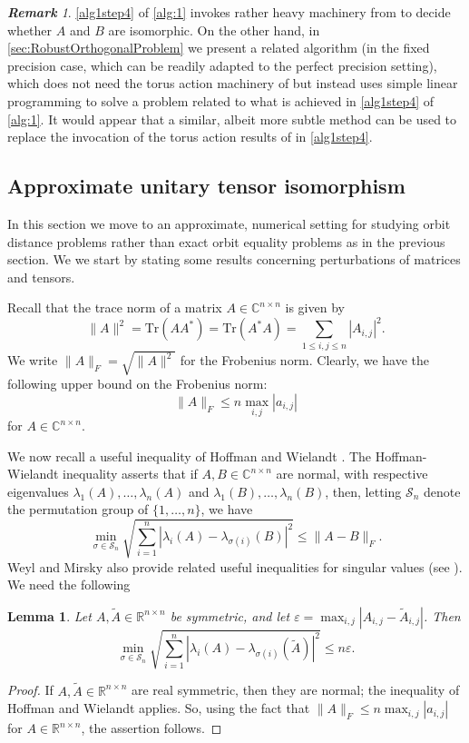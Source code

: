 \documentclass[11pt]{article}
\numberwithin{equation}{section}
\newtheorem{lemma}[theorem]{Lemma}
\theoremstyle{remark}
\newtheorem{remark}{\bf Remark}[section]
\newcommand{\R}{\mathbb{R}}
\newcommand{\CC}{\mathbb{C}}
\newcommand{\RR}{\mathbb{R}}
\newcommand{\cS}{\mathcal{S}}
\begin{document}
\begin{remark}
    \ref{alg1step4} of \cref{alg:1} invokes rather heavy machinery from \cite{burgisser_et_alCCC.2021.32} to decide whether $A$ and $B$ are isomorphic. On the other hand, in \cref{sec:RobustOrthogonalProblem} we present a related algorithm (in the fixed precision case, which can be readily adapted to the perfect precision setting), which does not need the torus action machinery of \cite{burgisser_et_alCCC.2021.32} but instead uses simple linear programming to solve a problem related to what is achieved in \ref{alg1step4} of \cref{alg:1}. It would appear that a similar, albeit more subtle method can be used to replace the invocation of the torus action results of \cite{burgisser_et_alCCC.2021.32} in \ref{alg1step4}.
\end{remark}




\subsection{Approximate unitary tensor isomorphism}

In this section we move to an approximate, numerical setting for studying orbit distance problems rather than exact orbit equality problems as in the previous section.
We we start by stating some results concerning perturbations of matrices and tensors.

Recall that the trace norm of a matrix $A \in \CC^{n\times n}$ is given by
\[
\|A\|^2 = \mathrm{Tr}(AA^*) = \mathrm{Tr}(A^* A) = \sum_{1\leq i, j \leq n} |A_{i,j}|^2.
\]
We write $\|A\|_F = \sqrt{\|A\|^2}$ for the Frobenius norm. Clearly, we have the following upper bound on the Frobenius norm:
\[
\|A\|_F \leq n \max_{i,j} |a_{i,j}|
\]
for $A \in \CC^{n\times n}$.

We now recall a useful inequality of Hoffman and Wielandt \cite{hoffman1953variation}. The Hoffman-Wielandt inequality asserts that if $A, B \in \CC^{n\times n}$ are normal, with respective eigenvalues $\lambda_1(A),\dots,\lambda_n(A)$ and $\lambda_1(B),\dots,\lambda_n(B)$, then, letting $\cS_n$ denote the permutation group of $\{1,\dots,n\}$, we have
\[
\min_{\sigma \in \cS_n}\sqrt{\sum_{i=1}^n |\lambda_i(A)-\lambda_{\sigma(i)}(B)|^2} \leq \|A-B\|_F.
\]
Weyl and Mirsky also provide related useful inequalities for singular values (see \cite{stewart1998perturbation}).
We need the following

\begin{lemma}\label{lem:truncation}
    Let $A,\tilde{A} \in \RR^{n\times n}$ be symmetric, and let $\varepsilon = \max_{i,j}|A_{i,j}-\tilde{A}_{i,j}|$.  Then
    \[
    \min_{\sigma \in \cS_n}\sqrt{\sum_{i=1}^n |\lambda_i(A)-\lambda_{\sigma(i)}(\tilde{A})|^2} \leq n\varepsilon.
    \]
\end{lemma}
\begin{proof}
If $A, \tilde{A} \in \RR^{n\times n}$ are real symmetric, then they are normal; the inequality of Hoffman and Wielandt applies. So, using the fact that $\|A\|_F \leq n \max_{i,j} |a_{i,j}|$ for $A \in \R^{n\times n}$, the assertion follows.
\end{proof}
\end{document}
